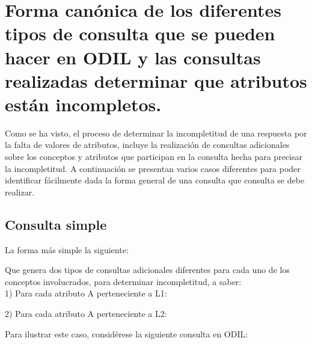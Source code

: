 \section{Forma canónica de los diferentes tipos de consulta que se pueden hacer en ODIL y las consultas realizadas determinar que atributos están incompletos.}\label{section-formaCanonica}

Como se ha visto, el proceso de determinar la incompletitud de una respuesta por la falta de valores de atributos, incluye la realización de consultas adicionales sobre los conceptos y atributos que participan en la consulta hecha para precisar la incompletitud. A continuación se presentan varios casos diferentes para poder identificar fácilmente dada la forma general de una consulta que consulta se debe realizar. \\

\subsection{Consulta simple}

La forma más simple la siguiente: \\


Que genera dos tipos  de consultas adicionales diferentes para cada uno de los conceptos involucrados, para determinar incompletitud, a saber: \\

1) Para cada atributo A perteneciente a L1: 


2) Para cada atributo A perteneciente a L2: 


Para ilustrar este caso, considérese la siguiente consulta en ODIL: \\

